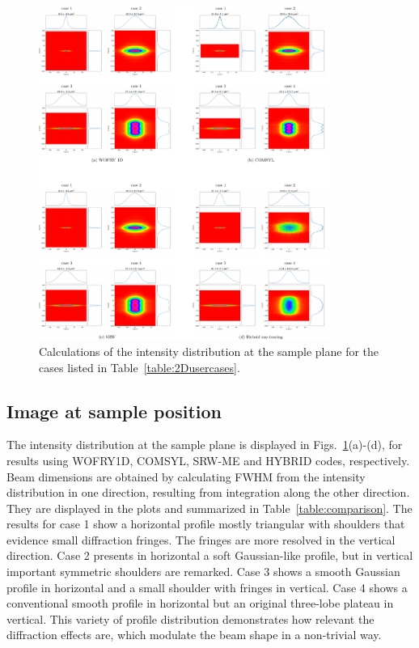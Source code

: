 \documentclass{iucr}
\newcommand{\whencolumns}[2]{#1}
\newcommand{\whencolumns}[2]{#2}
\begin{document}
\newpage
\whencolumns{}{\onecolumn}

\begin{figure}
    \label{fig:sim_results}
    \includegraphics[width=0.85\textwidth]{figures/fig_sim_results.pdf}
    \caption{Calculations of the intensity distribution at the sample plane for the cases listed in Table~\ref{table:2Dusercases}.}
\end{figure}

\whencolumns{}{\twocolumn}

\subsection{Image at sample position}

The intensity distribution at the sample plane is displayed in Figs.~\ref{fig:sim_results}(a)-(d), for results using WOFRY1D, COMSYL, SRW-ME and HYBRID codes, respectively.  Beam dimensions are obtained by calculating FWHM from the intensity distribution in one direction, resulting from integration along the other direction. They are displayed in the plots and summarized in Table~\ref{table:comparison}.
The results for case 1 show a horizontal profile mostly triangular with shoulders that evidence small diffraction fringes. The fringes are more resolved in the vertical direction. Case 2  presents in horizontal a soft Gaussian-like profile, but in vertical important symmetric shoulders are remarked. Case 3 shows a smooth Gaussian profile in horizontal and a small shoulder with fringes in vertical. Case 4 shows a conventional smooth profile in horizontal but an original three-lobe plateau in vertical. This variety of profile distribution demonstrates how relevant the diffraction effects are, which modulate the beam shape in a non-trivial way.  
\end{document}
